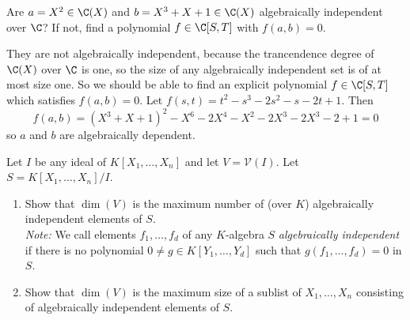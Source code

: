 \documentclass[11pt,letterpaper]{article}
\begin{document}
\begin{problem}
    Are $a=X^2\in\C(X)$ and $b=X^3+X+1\in\C(X)$ algebraically independent over $\C$? If not, find a polynomial $f\in\C[S,T]$ with $f(a,b)=0$.
\end{problem}

\begin{solution}
    They are not algebraically independent, because the trancendence degree of $\C(X)$ over $\C$ is one, so the size of any algebraically independent set is of at most size one. So we should be able to find an explicit polynomial $f\in \C[S,T]$ which satisfies $f(a,b)=0$. Let $f(s,t)=t^2-s^3-2s^2-s-2t+1$. Then
    \[
        f(a,b)=(X^3+X+1)^2-X^6-2X^4-X^2-2X^3-2X^3-2+1=0
    \]  
    so $a$ and $b$ are algebraically dependent.
\end{solution}

\begin{problem}
    Let $I$ be any ideal of $K[X_1,\dots,X_n]$ and let $V=\mathcal V(I)$. Let $S=K[X_1,\dots,X_n]/I$.
    \begin{enumerate}[label=\alph*)]
        \item Show that $\dim(V)$ is the maximum number of (over $K$) algebraically independent elements of $S$.\\
        \emph{Note:} We call elements $f_1,\dots,f_d$ of any $K$-algebra $S$ \emph{algebraically independent} if there is no polynomial $0\neq g\in K[Y_1,\dots,Y_d]$ such that $g(f_1,\dots,f_d)=0$ in $S$.
        \item Show that $\dim(V)$ is the maximum size of a sublist of $X_1,\dots,X_n$ consisting of algebraically independent elements of $S$.
    \end{enumerate}
\end{problem}
\end{document}

